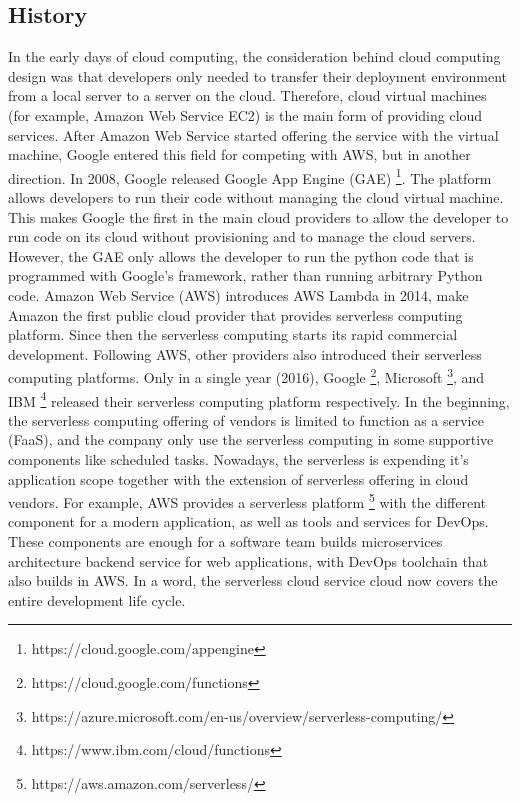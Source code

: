 \subsection{History}
In the early days of cloud computing, the consideration behind cloud computing design was that developers only needed to transfer their deployment environment from a local server to a server on the cloud. Therefore, cloud virtual machines (for example, Amazon Web Service EC2) is the main form of providing cloud services.
After Amazon Web Service started offering the service with the virtual machine, Google entered this field for competing with AWS, but in another direction.
In 2008, Google released Google App Engine (GAE) \footnote{https://cloud.google.com/appengine}\cite{zahariev2009google}. The platform allows developers to run their code without managing the cloud virtual machine. This makes Google the first in the main cloud providers to allow the developer to run code on its cloud without provisioning and to manage the cloud servers. However, the GAE only allows the developer to run the python code that is programmed with Google's framework, rather than running arbitrary Python code. 
Amazon Web Service (AWS) introduces AWS Lambda in 2014, make Amazon the first public cloud provider that provides serverless computing platform\cite{Serverle77:online}. Since then the serverless computing starts its rapid commercial development. Following AWS, other providers also introduced their serverless computing platforms. Only in a single year (2016), Google \footnote{https://cloud.google.com/functions}, Microsoft \footnote{https://azure.microsoft.com/en-us/overview/serverless-computing/}, and IBM \footnote{https://www.ibm.com/cloud/functions} released their serverless computing platform respectively. 
In the beginning, the serverless computing offering of vendors is limited to function as a service (FaaS), and the company only use the serverless computing in some supportive components like scheduled tasks.
Nowadays, the serverless is expending it's application scope together with the extension of serverless offering in cloud vendors. For example, AWS provides a serverless platform \footnote{https://aws.amazon.com/serverless/} with the different component for a modern application, as well as tools and services for DevOps. These components are enough for a software team builds microservices architecture backend service for web applications, with DevOps toolchain that also builds in AWS. In a word, the serverless cloud service cloud now covers the entire development life cycle.\label{servlessApp}
